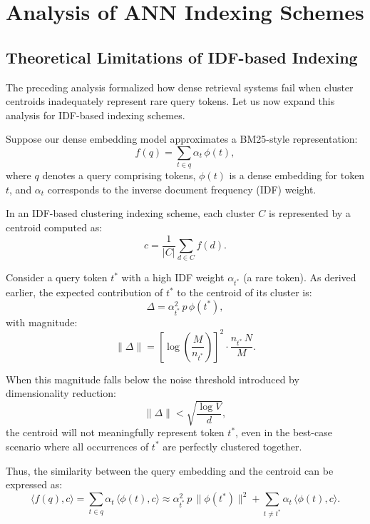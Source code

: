 \documentclass[sigconf,review]{acmart}
\begin{document}
\section{Analysis of ANN Indexing Schemes}

\subsection{Theoretical Limitations of IDF-based Indexing}
The preceding analysis formalized how dense retrieval systems fail when cluster centroids inadequately represent rare query tokens. Let us now expand this analysis for IDF-based indexing schemes.

Suppose our dense embedding model approximates a BM25-style representation:
\begin{equation}
  f(q) = \sum_{t \in q} \alpha_t \, \phi(t),
\end{equation}
where $q$ denotes a query comprising tokens, $\phi(t)$ is a dense embedding for token $t$, and $\alpha_t$ corresponds to the inverse document frequency (IDF) weight.

In an IDF-based clustering indexing scheme, each cluster $C$ is represented by a centroid computed as:
\begin{equation}
  c = \frac{1}{|C|} \sum_{d \in C} f(d).
\end{equation}

Consider a query token $t^*$ with a high IDF weight $\alpha_{t^*}$ (a rare token). As derived earlier, the expected contribution of $t^*$ to the centroid of its cluster is:
\begin{equation}
  \Delta = \alpha_{t^*}^2\, p\, \phi(t^*),
\end{equation}
with magnitude:
\begin{equation}
  \|\Delta\| = \left[\log\!\left(\frac{M}{n_{t^*}}\right)\right]^2 \cdot \frac{n_{t^*}\, N}{M}.
\end{equation}

When this magnitude falls below the noise threshold introduced by dimensionality reduction:
\begin{equation}
  \|\Delta\| < \sqrt{\frac{\log V}{d}},
\end{equation}
the centroid will not meaningfully represent token $t^*$, even in the best-case scenario where all occurrences of $t^*$ are perfectly clustered together.

Thus, the similarity between the query embedding and the centroid can be expressed as:
\begin{equation}
  \langle f(q), c \rangle 
  = \sum_{t \in q} \alpha_t \, \langle \phi(t), c \rangle
  \approx \alpha_{t^*}^2 \, p \, \|\phi(t^*)\|^2 + \sum_{t \neq t^*} \alpha_t \, \langle \phi(t), c \rangle.
\end{equation}
\end{document}
